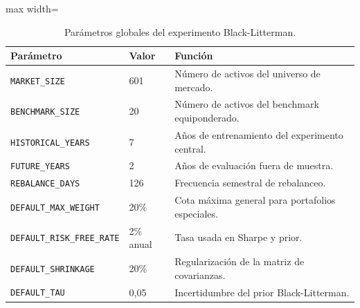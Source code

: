 \begin{table}[H]
\centering
\caption{Par\'ametros globales del experimento Black-Litterman.}
\label{tab:anexo4_bl_parametros_globales}
\small
\begin{adjustbox}{max width=\textwidth}
\begin{tabular}{@{}p{}p{}p{}@{}}
\toprule
Par\'ametro & Valor & Funci\'on \\
\midrule
\texttt{MARKET\_SIZE} & 601 & N\'umero de activos del universo de mercado. \\
\texttt{BENCHMARK\_SIZE} & 20 & N\'umero de activos del benchmark equiponderado. \\
\texttt{HISTORICAL\_YEARS} & 7 & A\~nos de entrenamiento del experimento central. \\
\texttt{FUTURE\_YEARS} & 2 & A\~nos de evaluaci\'on fuera de muestra. \\
\texttt{REBALANCE\_DAYS} & 126 & Frecuencia semestral de rebalanceo. \\
\texttt{DEFAULT\_MAX\_WEIGHT} & 20\% & Cota m\'axima general para portafolios especiales. \\
\texttt{DEFAULT\_RISK\_FREE\_RATE} & 2\% anual & Tasa usada en Sharpe y prior. \\
\texttt{DEFAULT\_SHRINKAGE} & 20\% & Regularizaci\'on de la matriz de covarianzas. \\
\texttt{DEFAULT\_TAU} & 0,05 & Incertidumbre del prior Black-Litterman. \\
\bottomrule
\end{tabular}
\end{adjustbox}
\end{table}

